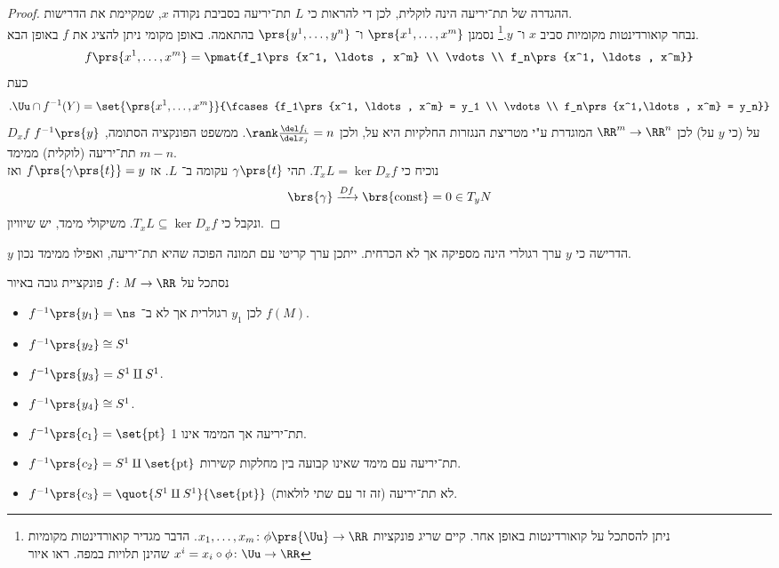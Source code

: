 \documentclass[a4paper,10pt,twoside,openany]{book}
\begin{document}
\begin{proof}
ההגדרה של תת־יריעה הינה לוקלית, לכן די להראות כי
$L$
תת־יריעה בסביבת נקודה
$x$,
שמקיימת את הדרישות.\\
נבחר קואורדינטות מקומיות סביב
$x$
ו־%
$y$.\footnote{ניתן להסתכל על קואורדינטות באופן אחר. קיים שריג פונקציות
$x_1, \ldots, x_m \colon \phi\prs{\Uu} \to \RR$. הדבר מגדיר קואורדינטות מקומיות
$x^i = x_i \circ \phi \colon \Uu \to \RR$
שהינן תלויות במפה. ראו איור
}
נסמנן
$\prs{x^1, \ldots, x^m}$
ו־%
$\prs{y^1, \ldots, y^n}$
בהתאמה.
באופן מקומי ניתן להציג את
$f$
באופן הבא.
\[f\prs{x^1, \ldots, x^m} = \pmat{f_1\prs{x^1, \ldots, x^m} \\ \vdots \\ f_n\prs{x^1, \ldots, x^m}}\]
כעת
\[\text{.} \Uu \cap f^{-1}(Y) = \set{\prs{x^1, \ldots, x^m}}{\fcases{f_1\prs{x^1, \ldots, x^m} = y_1 \\ \vdots \\ f_n\prs{x^1,\ldots, x^m} = y_n}}\]
$D_x f$
על
(כי
$y$
על) לכן
$\RR^m \to \RR^n$
המוגדרת ע"י מטריצת הנגזרות החלקיות היא על, ולכן
$\rank \frac{\del f_i}{\del x_j} = n$.
ממשפט הפונקציה הסתומה,
$f^{-1}\prs{y}$
תת־יריעה (לוקלית) ממימד
$m-n$.\\
נוכיח כי
$T_xL = \ker D_x f$.
תהי
$\gamma\prs{t}$
עקומה ב־%
$L$.
אז
$f\prs{\gamma\prs{t}} = y$
ואז
\[\brs{\gamma} \xrightarrow{Df} \brs{\text{const}} = 0 \in T_y N\]
ונקבל כי
$T_x L \subseteq \ker D_x f$.
משיקולי מימד, יש שיוויון.
\end{proof}
\begin{remark}
$y$
הדרישה כי
$y$
ערך רגולרי
הינה מספיקה אך לא הכרחית.
ייתכן ערך קריטי עם תמונה הפוכה שהיא תת־יריעה, ואפילו ממימד נכון.
\end{remark}
\begin{example}
נסתכל על
$f \colon M \to \RR$
פונקציית גובה באיור
\begin{itemize}
\item
$f^{-1}\prs{y_1} = \ns$
לכן
$y_1$
רגולרית אך לא ב־%
$f(M)$.
\item
$f^{-1}\prs{y_2} \cong S^1$
\item $f^{-1}\prs{y_3} = S^1 \amalg S^1$.
\item $f^{-1}\prs{y_4} \cong S^1$.
\item $f^{-1}\prs{c_1} = \set{\text{pt}}$
תת־יריעה אך המימד אינו 1.
\item $f^{-1}\prs{c_2} = S^1 \amalg \set{\text{pt}}$
תת־יריעה עם מימד שאינו קבועה בין מחלקות קשירות.
\item $f^{-1}\prs{c_3} = \quot{S^1 \amalg S^1}{\set{\text{pt}}}$
לא תת־יריעה (זה זר עם שתי לולאות).
\end{itemize}
\end{example}
\backmatter
\end{document}
